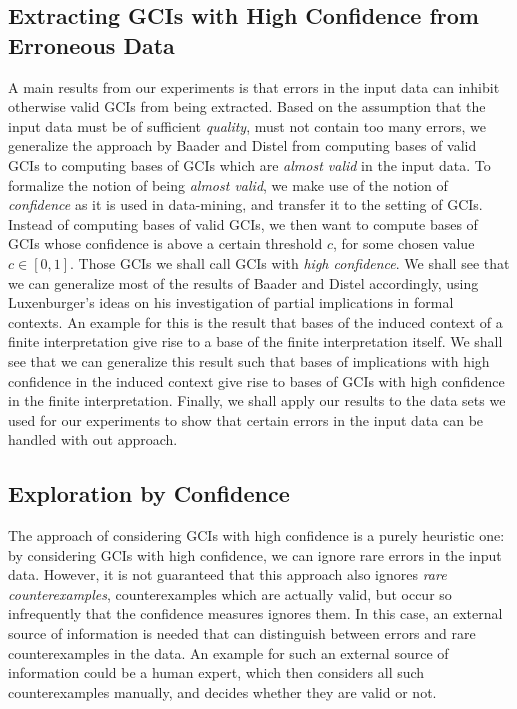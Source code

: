 \subsection{Extracting GCIs with High Confidence from Erroneous Data}
\label{sec:extracting-gcis-from}

A main results from our experiments is that errors in the input data can inhibit otherwise
valid GCIs from being extracted.  Based on the assumption that the input data must be of
sufficient \emph{quality}, \ie must not contain too many errors, we generalize the
approach by Baader and Distel from computing bases of valid GCIs to computing bases of
GCIs which are \emph{almost valid} in the input data.  To formalize the notion of being
\emph{almost valid}, we make use of the notion of \emph{confidence} as it is used in
data-mining, and transfer it to the setting of GCIs.  Instead of computing bases of valid
GCIs, we then want to compute bases of GCIs whose confidence is above a certain threshold
$c$, for some chosen value $c \in [0,1]$.  Those GCIs we shall call GCIs with \emph{high
  confidence}.  We shall see that we can generalize most of the results of Baader and
Distel accordingly, using Luxenburger's ideas on his investigation of partial implications
in formal contexts.  An example for this is the result that bases of the induced context
of a finite interpretation give rise to a base of the finite interpretation itself.  We
shall see that we can generalize this result such that bases of implications with high
confidence in the induced context give rise to bases of GCIs with high confidence in the
finite interpretation.  Finally, we shall apply our results to the data sets we used for
our experiments to show that certain errors in the input data can be handled with out
approach.

\subsection{Exploration by Confidence}
\label{sec:expl-conf-2}

The approach of considering GCIs with high confidence is a purely heuristic one: by
considering GCIs with high confidence, we can ignore rare errors in the input data.
However, it is not guaranteed that this approach also ignores \emph{rare counterexamples},
\ie counterexamples which are actually valid, but occur so infrequently that the
confidence measures ignores them.  In this case, an external source of information is
needed that can distinguish between errors and rare counterexamples in the data.  An
example for such an external source of information could be a human expert, which then
considers all such counterexamples manually, and decides whether they are valid or not.

